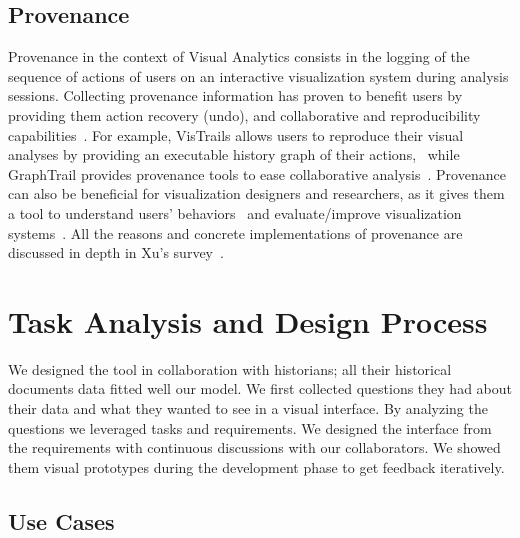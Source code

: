 \subsection{Provenance}

Provenance in the context of Visual Analytics consists in the logging of the sequence of actions of users on an interactive visualization system during analysis sessions. Collecting provenance information has proven to benefit users by providing them action recovery (undo), and collaborative and reproducibility capabilities~\cite{raganCharacterizingProvenanceVisualization2016}. For example, VisTrails allows users to reproduce their visual analyses by providing an executable history graph of their actions,~\cite{callahanVisTrailsVisualizationMeets2006} while GraphTrail provides provenance tools to ease collaborative analysis~\cite{dunneGraphTrailAnalyzingLarge2012}.
Provenance can also be beneficial for visualization designers and researchers, as it gives them a tool to understand users' behaviors~\cite{battleCharacterizingExploratoryVisual2019, borsProvenanceTaskAbstraction2019}
and evaluate/improve visualization systems~\cite{renCharticulatorInteractiveConstruction2019}.
All the reasons and concrete implementations of provenance are discussed in depth in Xu's survey~\cite{xuSurveyAnalysisUser2020}.

\section{Task Analysis and Design Process}\label{sec:tasks}

We designed the \name tool in collaboration with historians; all their historical documents data fitted well our \model model.
We first collected questions they had about their data and what they wanted to see in a visual interface.
By analyzing the questions we leveraged tasks and requirements.
We designed the interface from the requirements with continuous discussions with our collaborators.
We showed them visual prototypes during the development phase to get feedback iteratively.

\subsection{Use Cases}

